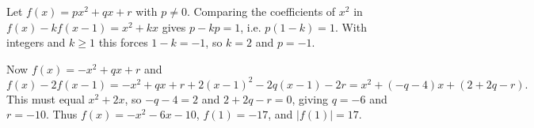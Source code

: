 Let $f(x)=px^2+qx+r$ with $p\ne0$. Comparing the coefficients of $x^2$ in $f(x)-kf(x-1)=x^2+kx$ gives $p-kp=1$, i.e. $p(1-k)=1$. With integers and $k\ge1$ this forces $1-k=-1$, so $k=2$ and $p=-1$.

Now $f(x)=-x^2+qx+r$ and
\[f(x)-2f(x-1)=-x^2+qx+r+2(x-1)^2-2q(x-1)-2r=x^2+(-q-4)x+(2+2q-r).\]
This must equal $x^2+2x$, so $-q-4=2$ and $2+2q-r=0$, giving $q=-6$ and $r=-10$. Thus $f(x)=-x^2-6x-10$, $f(1)=-17$, and $|f(1)|=\boxed{17}$.
